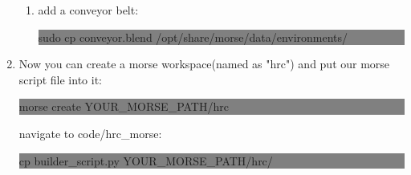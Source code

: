 \begin{enumerate}
\begin{enumerate}
	\item add a conveyor belt: \\
	\colorbox{gray}{\begin{minipage}{\linewidth} sudo cp conveyor.blend /opt/share/morse/data/environments/  \end{minipage}}
	\end{enumerate}
\item Now you can create a morse workspace(named as "hrc") and put our morse script file into it:\\
\colorbox{gray}{\begin{minipage}{\linewidth} morse create YOUR\_MORSE\_PATH/hrc \end{minipage}}
navigate to code/hrc\_morse:\\
\colorbox{gray}{\begin{minipage}{\linewidth} cp builder\_script.py YOUR\_MORSE\_PATH/hrc/ \end{minipage}}
\end{enumerate}

